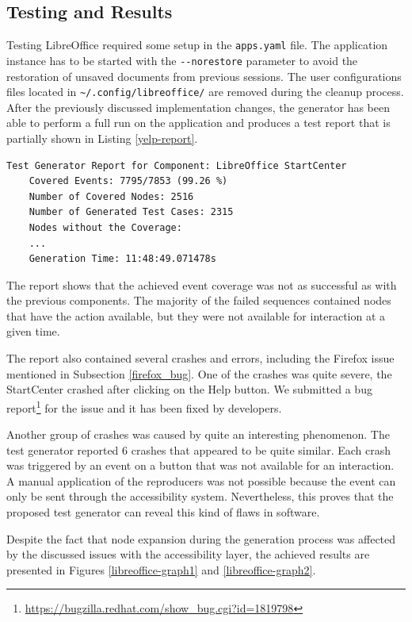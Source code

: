 \subsection{Testing and Results}
Testing LibreOffice required some setup in the \texttt{apps.yaml} file. The application instance has to be started with the \texttt{-{}-norestore} parameter to avoid the restoration of unsaved documents from previous sessions. The user configurations files located in \texttt{\textasciitilde/.config/libreoffice/} are removed during the cleanup process. After the previously discussed implementation changes, the generator has been able to perform a full run on the application and produces a test report that is partially shown in Listing \ref{yelp-report}.

\begin{lstlisting}[caption={Final test generator report for LibreOffice StartCenter},label={yelp-report}]
    Test Generator Report for Component: LibreOffice StartCenter
    Covered Events: 7795/7853 (99.26 %) 
    Number of Covered Nodes: 2516
    Number of Generated Test Cases: 2315
    Nodes without the Coverage:
    ...
    Generation Time: 11:48:49.071478s
\end{lstlisting}

The report shows that the achieved event coverage was not as successful as with the previous components. The majority of the failed sequences contained nodes that have the action available, but they were not available for interaction at a given time. 

The report also contained several crashes and errors, including the Firefox issue mentioned in Subsection \ref{firefox_bug}. One of the crashes was quite severe, the StartCenter crashed after clicking on the Help button. We submitted a bug report\footnote{\url{https://bugzilla.redhat.com/show_bug.cgi?id=1819798}} for the issue and it has been fixed by developers. 

Another group of crashes was caused by quite an interesting phenomenon. The test generator reported 6 crashes that appeared to be quite similar. Each crash was triggered by an event on a button that was not available for an interaction. A manual application of the reproducers was not possible because the event can only be sent through the accessibility system. Nevertheless, this proves that the proposed test generator can reveal this kind of flaws in software.

Despite the fact that node expansion during the generation process was affected by the discussed issues with the accessibility layer, the achieved results are presented in Figures \ref{libreoffice-graph1} and \ref{libreoffice-graph2}.

